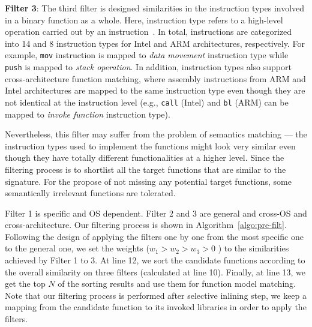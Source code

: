 \textbf{Filter 3}: %
The third filter is designed  similarities in the instruction types involved in a binary function as a whole. Here, instruction type refers to a high-level operation carried out by an instruction~\cite{kruegel2005polymorphic}. In total, instructions are categorized into 14 and 8 instruction types for Intel and ARM architectures, respectively. For example, \texttt{mov} instruction is mapped to \textit{data movement} instruction type while \texttt{push} is mapped to \textit{stack operation}.
In addition, instruction types also support cross-architecture function matching, where assembly instructions from ARM and Intel architectures are mapped to the same instruction type even though they are not identical at the instruction level (e.g., \texttt{call} (Intel) and \texttt{bl} (ARM) can be mapped to \textit{invoke function} instruction type).

Nevertheless, this filter may suffer from the problem of semantics matching --- the instruction types used to implement the functions might look very similar even though they have totally different functionalities at a higher level.
Since the filtering process is to shortlist all the target functions that are similar to the signature. %
For the propose of not missing any potential target functions, some semantically irrelevant functions are tolerated.

Filter 1 is specific and OS dependent. Filter 2 and 3 are general and cross-OS and cross-architecture.
Our filtering process is shown in Algorithm~\ref{algo:pre-filt}. Following the design of applying the filters one by one from the most specific one to the general one, we set the weights ($w_1 > w_2 > w_3 >0$ ) to the similarities achieved by Filter 1 to 3. At line 12, we sort the candidate functions according to the overall similarity on three filters (calculated at line 10). Finally, at line 13, we get the top $N$ of the sorting results and use them for function model matching.
Note that our filtering process is performed after selective inlining step,  we keep a mapping from the candidate function to its invoked libraries in order to apply the filters.

